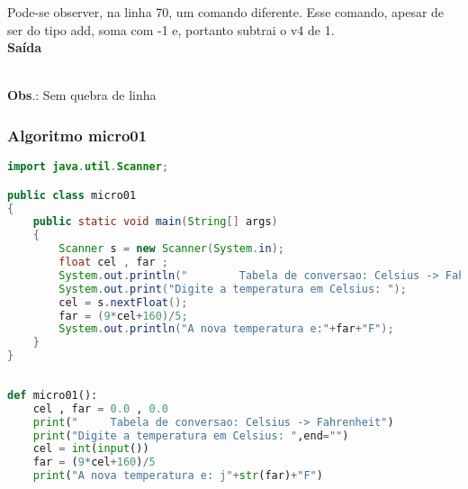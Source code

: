 \documentclass[hidelinks,12pt]{article}
\begin{document}
	Pode-se observer, na linha 70, um comando diferente. Esse comando, apesar de ser do tipo add, soma com -1 e, portanto subtrai o v4 de 1.\\
	
	{\large{\textbf{Saída}}}
	
	\noindent{}\\	
	
	\textbf{Obs}.: Sem quebra de linha\\	
	
	\subsubsection{Algoritmo micro01}
	
	\begin{lstlisting}[caption=Código em Java,language=java]
import java.util.Scanner;

public class micro01
{
	public static void main(String[] args)
	{
		Scanner s = new Scanner(System.in);
		float cel , far ;
		System.out.println("		Tabela de conversao: Celsius -> Fahrenheit");
		System.out.print("Digite a temperatura em Celsius: ");
		cel = s.nextFloat();
		far = (9*cel+160)/5;
		System.out.println("A nova temperatura e:"+far+"F");
	}
}	
	
	\end{lstlisting}
	
	\begin{lstlisting}[caption=Código em python,language=Python]
def micro01():
	cel , far = 0.0 , 0.0
	print("		Tabela de conversao: Celsius -> Fahrenheit")
	print("Digite a temperatura em Celsius: ",end="")
	cel = int(input())
	far = (9*cel+160)/5
	print("A nova temperatura e: j"+str(far)+"F")	
	
	\end{lstlisting}
	
\end{document}
